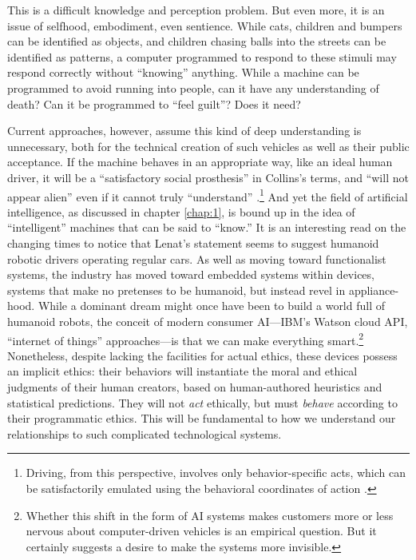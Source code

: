 This is a difficult knowledge and perception problem. But even more,
it is an issue of selfhood, embodiment, even sentience. While cats,
children and bumpers can be identified as objects, and children
chasing balls into the streets can be identified as patterns, a
computer programmed to respond to these stimuli may respond correctly
without ``knowing'' anything. While a machine can be programmed to avoid
running into people, can it have any understanding of death? Can it be
programmed to ``feel guilt''? Does it need?





Current approaches, however, assume this kind of deep understanding is
unnecessary, both for the technical creation of such vehicles as well
as their public acceptance. If the machine behaves in an appropriate
way, like an ideal human driver, it will be a ``satisfactory social
prosthesis'' in Collins's terms, and ``will not appear alien'' even if
it cannot truly ``understand'' \cite[p. 31]{Collins}.\footnote{Driving, from
this perspective, involves only behavior-specific acts, which can be
satisfactorily emulated using the behavioral coordinates of
action \cite[p. 33--37]{Collins}.} And yet the field of artificial
intelligence, as discussed in chapter \ref{chap:1}, is bound up in the idea 
of ``intelligent'' machines that can be said to ``know.'' It is an
interesting read on the changing 
times to notice that Lenat's statement seems to suggest humanoid
robotic drivers operating regular cars. As well as moving toward
functionalist systems, the industry has moved toward embedded systems
within devices, systems that make no pretenses to be humanoid, but
instead revel in appliance-hood. While a dominant dream might once have been
to build a world full of humanoid robots, the conceit of modern
consumer AI---IBM's Watson cloud API, ``internet of things''
approaches---is that we can make everything smart.\footnote{Whether this shift
in the form of AI 
systems makes customers more or less nervous about computer-driven
vehicles is an empirical question. But it certainly suggests a desire
to make the systems more 
invisible.}
Nonetheless, despite lacking the facilities for actual ethics, these
devices possess an implicit ethics: their
behaviors will instantiate the moral and
ethical judgments of their human creators, based on
human-authored heuristics and statistical predictions. They will not
\emph{act} ethically, but must
\emph{behave} according to their programmatic ethics. This will be
fundamental to how we understand our relationships to such
complicated technological systems.

